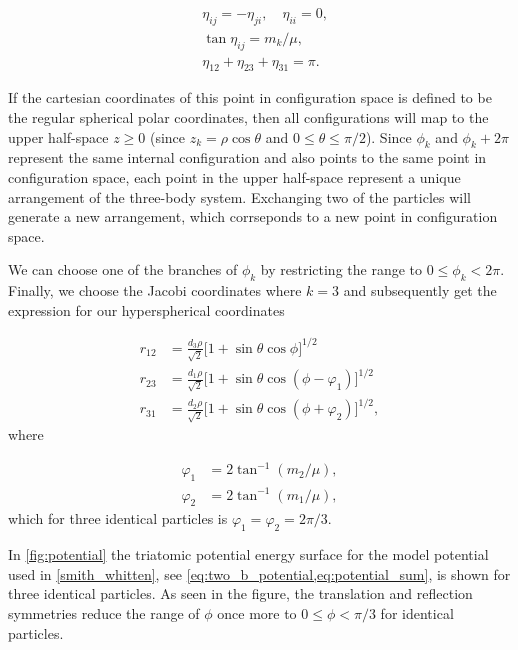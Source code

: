 \begin{subequations}
	\begin{align}
	&\eta_{ij} = -\eta_{ji}, \quad \eta_{ii} = 0,\\
	&\tan\eta_{ij} = m_k/\mu,\\
	&\eta_{12}+\eta_{23}+\eta_{31} = \pi.
	\end{align} 
\end{subequations}

If the cartesian coordinates of this point in configuration space is defined to be the regular spherical polar coordinates, then all configurations will map to the upper half-space $z \geq 0$ (since $z_k=\rho\cos\theta$ and $0\leq \theta \leq \pi/2$). Since $\phi_k$ and $\phi_k + 2\pi$ represent the same internal configuration and also points to the same point in configuration space, each point in the upper half-space represent a unique arrangement of the three-body system. Exchanging two of the particles will generate a new arrangement, which corrseponds to a new point in configuration space. 

We can choose one of the branches of $\phi_k$ by restricting the range to $0 \leq \phi_k < 2\pi$. Finally, we choose the Jacobi coordinates where $k=3$ and subsequently get the expression for our hyperspherical coordinates

\begin{equation}
\begin{aligned}
r_{12} &= \frac{d_3\rho}{\sqrt{2}}\big[1+\sin\theta\cos\phi\big]^{1/2}\\
r_{23} &= \frac{d_1\rho}{\sqrt{2}}\big[1 + \sin\theta\cos(\phi-\varphi_1)\big]^{1/2}\\
r_{31} &= \frac{d_2\rho}{\sqrt{2}}\big[1 + \sin\theta\cos(\phi + \varphi_2)\big]^{1/2},
\end{aligned}
\end{equation}
where

\begin{equation}
\begin{aligned}
\varphi_1 &= 2\tan^{-1}(m_2/\mu),\\
\varphi_2 &= 2\tan^{-1}(m_1/\mu),
\end{aligned}
\end{equation}
which for three identical particles is $\varphi_1=\varphi_2=2\pi/3$.

In \cref{fig:potential} the triatomic potential energy surface for the model potential used in \cref{smith_whitten}, see \cref{eq:two_b_potential,eq:potential_sum}, is shown for three identical particles. As seen in the figure, the translation and reflection symmetries reduce the range of $\phi$ once more to $0 \leq \phi < \pi/3$ for identical particles. 

